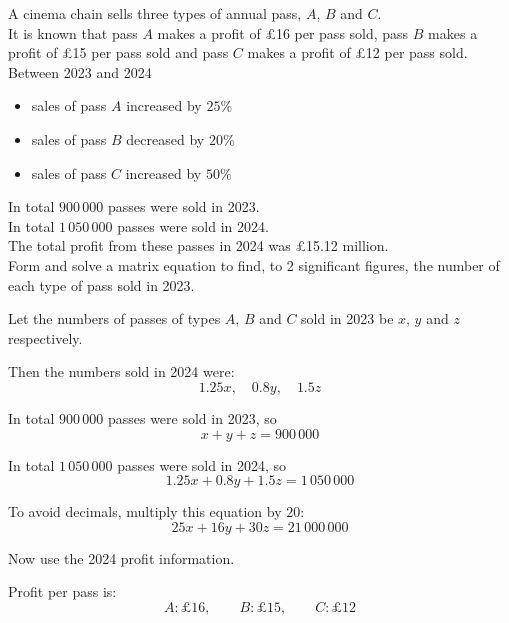 \documentclass[leqno]{article}
\begin{document}
\begin{enumerate}[
  label=\textbf{\arabic*.},
  leftmargin=*,
  topsep=0pt,
  partopsep=0pt,
  parsep=0pt
]
\newpage

\questionitem

A cinema chain sells three types of annual pass, $A$, $B$ and $C$. \\

It is known that pass $A$ makes a profit of \pounds 16 per pass sold, pass $B$ makes a profit of \pounds 15 per pass sold and pass $C$ makes a profit of \pounds 12 per pass sold. \\

Between 2023 and 2024
\begin{itemize}
\item sales of pass $A$ increased by $25\%$
\item sales of pass $B$ decreased by $20\%$
\item sales of pass $C$ increased by $50\%$
\end{itemize}

In total $900\,000$ passes were sold in 2023. \\

In total $1\,050\,000$ passes were sold in 2024. \\

The total profit from these passes in 2024 was \pounds 15.12 million. \\

Form and solve a matrix equation to find, to $2$ significant figures, the number of each type of pass sold in 2023.  \\

\vspace*{10pt}

\begin{djsSolution}
Let the numbers of passes of types \(A\), \(B\) and \(C\) sold in 2023 be \(x\), \(y\) and \(z\) respectively.

Then the numbers sold in 2024 were:
\[
1.25x,\quad 0.8y,\quad 1.5z
\]

In total \(900\,000\) passes were sold in 2023, so
\[
x+y+z=900\,000
\]

In total \(1\,050\,000\) passes were sold in 2024, so
\[
1.25x+0.8y+1.5z=1\,050\,000
\]

To avoid decimals, multiply this equation by \(20\):
\[
25x+16y+30z=21\,000\,000
\]

Now use the 2024 profit information.

Profit per pass is:
\[
A:\pounds 16,\qquad B:\pounds 15,\qquad C:\pounds 12
\]


\end{djsSolution}
\end{enumerate}
\end{document}
